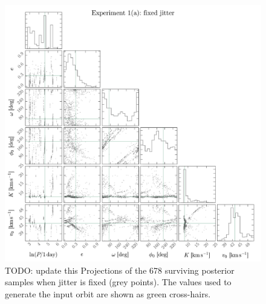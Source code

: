 \documentclass[manuscript, letterpaper]{aastex6}
\newcommand{\todo}[1]{{\color{red}TODO: #1}}
\begin{document}
\begin{figure}[p]
\begin{center}
\includegraphics[width=\textwidth]{figures/validation-corner-a.pdf}
\end{center}
\caption{%
\todo{update this}
Projections of the 678 surviving posterior samples when jitter is fixed (grey
points).
The values used to generate the input orbit are shown as green cross-hairs.
\label{fig:validation-corner-a}}
\end{figure}
\end{document}
